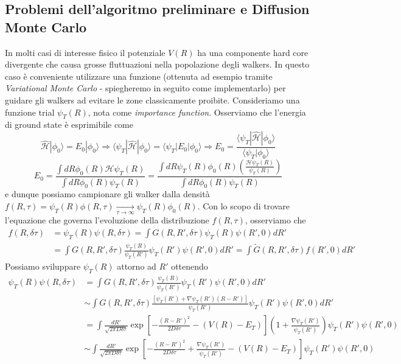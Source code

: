 \documentclass[11pt,a4paper]{article}
\begin{document}
\subsection{Problemi dell'algoritmo preliminare e Diffusion Monte Carlo}
In molti casi di interesse fisico il potenziale $V(R)$ ha una componente hard core divergente che causa grosse fluttuazioni nella popolazione degli walkers. In questo caso è conveniente utilizzare una funzione (ottenuta ad esempio tramite \emph{Variational Monte Carlo} - spiegheremo in seguito come implementarlo) per guidare gli walkers ad evitare le zone classicamente proibite. Consideriamo una funzione trial $\psi_T(R)$, nota come \emph{importance function}. Osserviamo che l'energia di ground state è esprimibile come
\[
\mathcal{\hat{H}}|\phi_0\rangle = E_0 |\phi_0\rangle \Longrightarrow \langle \psi_T|\mathcal{\hat{H}}|\phi_0\rangle = \langle \psi_T| E_0 |\phi_0\rangle \Longrightarrow E_0 = \frac{\langle \psi_T|\mathcal{\hat{H}}|\phi_0\rangle}{\langle \psi_T| \phi_0\rangle}
\]
\[
E_0 = \frac{\int dR \phi_0(R)\mathcal{H}\psi_T(R)}{\int dR \phi_0(R) \psi_T(R)} = \frac{\int dR \psi_T(R)\phi_0(R) \left(\frac{\mathcal{H}\psi_T(R)}{\psi_T(R)}\right)}{\int dR \phi_0(R) \psi_T(R)}
\]
e dunque possiamo campionare gli walker dalla densità $f(R,\tau) = \psi_T(R)\phi(R,\tau) \xrightarrow[\tau \to \infty]{} \psi_T(R)\phi_0(R)$. Con lo scopo di trovare l'equazione che governa l'evoluzione della distribuzione $f(R,\tau)$, osserviamo che
\[
\begin{split}
f(R,\delta \tau) &= \psi_T(R) \psi(R,\delta \tau) = \int G(R,R',\delta \tau)\psi_T(R) \psi(R',0) dR' \\
&= \int G(R,R',\delta \tau) \frac{\psi_T(R)}{\psi_T(R')} \psi_T(R')\psi(R',0) dR' = \int \tilde{G}(R,R',\delta \tau) f(R',0)dR'
\end{split}
\]
Possiamo sviluppare $\psi_T(R)$ attorno ad $R'$ ottenendo
\[
\begin{split}
\psi_T(R) \psi(R,\delta \tau) &= \int G(R,R',\delta \tau) \frac{\psi_T(R)}{\psi_T(R')} \psi_T(R')\psi(R',0) dR'  \\
&\sim \int G(R,R',\delta \tau) \frac{[\psi_T(R') + \nabla \psi_T(R')(R-R')]}{\psi_T(R')} \psi_T(R')\psi(R',0) dR' \\
&= \int \frac{dR'}{\sqrt{2\pi D \delta \tau}}\exp\left[ -\frac{(R-R')^2}{2D\delta \tau} - (V(R)-E_T) \right] \left( 1 + \frac{\nabla \psi_T(R')}{\psi_T(R')}\right) \psi_T(R')\psi(R',0) \\
&\sim \int \frac{dR'}{\sqrt{2\pi D \delta \tau}}\exp\left[ -\frac{(R-R')^2}{2D\delta \tau} + \frac{\nabla \psi_T(R')}{\psi_T(R')} - (V(R)-E_T) \right] \psi_T(R')\psi(R',0) 
\end{split}
\]
\end{document}
